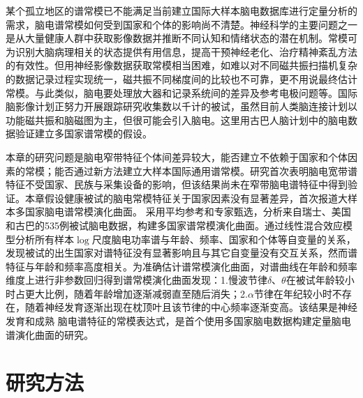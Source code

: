 某个孤立地区的谱常模已不能满足当前建立国际大样本脑电数据库进行定量分析的需求，脑电谱常模如何受到国家和个体的影响尚不清楚。神经科学的主要问题之一是从大量健康人群中获取影像数据并推断不同认知和情绪状态的潜在机制。常模可为识别大脑病理相关的状态提供有用信息，提高干预神经老化、治疗精神紊乱方法的有效性。但用神经影像数据获取常模相当困难，如难以对不同磁共振扫描机复杂的数据记录过程实现统一，磁共振不同梯度间的比较也不可靠，更不用说最终估计常模。与此类似，脑电要处理放大器和记录系统间的差异及参考电极问题等。国际脑影像计划正努力开展跟踪研究收集数以千计的被试，虽然目前人类脑连接计划以功能磁共振和脑磁图为主，但很可能会引入脑电。这里用古巴人脑计划中的脑电数据验证建立多国家谱常模的假设。

本章的研究问题是脑电窄带特征个体间差异较大，能否建立不依赖于国家和个体因素的常模；能否通过新方法建立大样本国际通用谱常模。研究首次表明脑电宽带谱特征不受国家、民族与采集设备的影响，但该结果尚未在窄带脑电谱特征中得到验证。本章假设健康被试的脑电常模特征关于国家因素没有显著差异，首次报道大样本多国家脑电谱常模演化曲面。
采用平均参考和专家甄选，分析来自瑞士、美国和古巴的535例被试脑电数据，构建多国家谱常模演化曲面。通过线性混合效应模型分析所有样本$\log$尺度脑电功率谱与年龄、频率、国家和个体等自变量的关系，发现被试的出生国家对谱特征没有显著影响且与其它自变量没有交互关系，然而谱特征与年龄和频率高度相关。为准确估计谱常模演化曲面，对谱曲线在年龄和频率维度上进行非参数回归得到谱常模演化曲面发现：1.慢波节律$\delta$、$\theta$在被试年龄较小时占更大比例，随着年龄增加逐渐减弱直至随后消失；2.$\alpha$节律在年纪较小时不存在，随着神经发育逐渐出现在枕顶叶且该节律的中心频率逐渐变高。该结果是神经发育和成熟
脑电谱特征的常模表达式，是首个使用多国家脑电数据构建定量脑电谱演化曲面的研究。
\section{研究方法}
